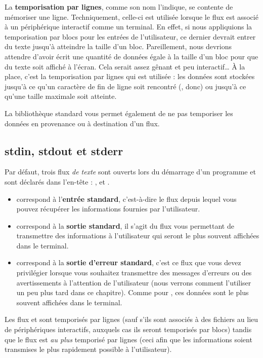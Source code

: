 La \textbf{temporisation par lignes}, comme son nom l'indique, se
contente de mémoriser une ligne. Techniquement, celle-ci est utilisée
lorsque le flux est associé à un périphérique interactif comme un
terminal. En effet, si nous appliquions la temporisation par blocs pour
les entrées de l'utilisateur, ce dernier devrait entrer du texte jusqu'à
atteindre la taille d'un bloc. Pareillement, nous devrions attendre
d'avoir écrit une quantité de données égale à la taille d'un bloc pour
que du texte soit affiché à l'écran. Cela serait assez gênant et peu
interactif\ldots{} À la place, c'est la temporisation par lignes qui est
utilisée : les données sont stockées jusqu'à ce qu'un caractère de fin
de ligne soit rencontré (, donc) ou jusqu'à ce
qu'une taille maximale soit atteinte.

La bibliothèque standard vous permet également de ne pas temporiser les
données en provenance ou à destination d'un flux.

\subsection{stdin, stdout et stderr}
\label{stdin-stdout-et-stderr}

Par défaut, trois flux \emph{de texte} sont ouverts lors du démarrage
d'un programme et sont déclarés dans l'en-tête
 : ,
 et .

\begin{itemize}
\item
   correspond à l'\textbf{entrée standard}, c'est-à-dire
  le flux depuis lequel vous pouvez récupérer les informations fournies
  par l'utilisateur.
\item
   correspond à la \textbf{sortie standard}, il s'agit du
  flux vous permettant de transmettre des informations à l'utilisateur
  qui seront le plus souvent affichées dans le terminal.
\item
   correspond à la \textbf{sortie d'erreur standard},
  c'est ce flux que vous devez privilégier lorsque vous souhaitez
  transmettre des messages d'erreurs ou des avertissements à l'attention
  de l'utilisateur (nous verrons comment l'utiliser un peu plus tard
  dans ce chapitre). Comme pour , ces données sont le
  plus souvent affichées dans le terminal.
\end{itemize}

Les flux  et  sont temporisés par lignes
(sauf s'ils sont associés à des fichiers au lieu de périphériques
interactifs, auxquels cas ils seront temporisés par blocs) tandis que le
flux  est \emph{au plus} temporisé par lignes (ceci afin
que les informations soient transmises le plus rapidement possible à
l'utilisateur).

